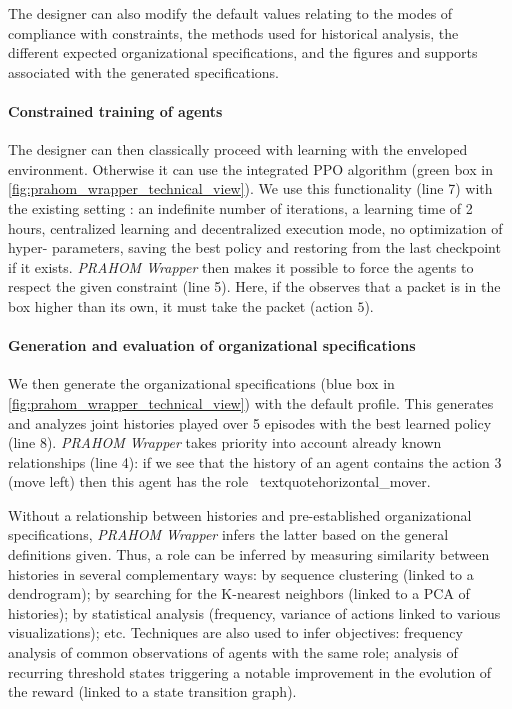 \documentclass{ecai}
\newcounter{relation}
\begin{document}
The designer can also modify the default values relating to the modes of compliance with constraints, the methods used for historical analysis, the different expected organizational specifications, and the figures and supports associated with the generated specifications.

\paragraph{Constrained training of agents}

The designer can then classically proceed with learning with the enveloped environment. Otherwise it can use the integrated PPO algorithm (green box in \autoref{fig:prahom_wrapper_technical_view}). We use this functionality (line 7) with the existing setting : an indefinite number of iterations, a learning time of 2 hours, centralized learning and decentralized execution mode, no optimization of hyper- parameters, saving the best policy and restoring from the last checkpoint if it exists.
\emph{PRAHOM Wrapper} then makes it possible to force the agents to respect the given constraint (line 5). Here, if the  observes that a packet is in the box higher than its own, it must take the packet (action $5$).

\paragraph{Generation and evaluation of organizational specifications}

We then generate the organizational specifications (blue box in \autoref{fig:prahom_wrapper_technical_view}) with the default profile. This generates and analyzes joint histories played over 5 episodes with the best learned policy (line 8).
\emph{PRAHOM Wrapper} takes priority into account already known relationships (line 4): if we see that the history of an agent contains the action $3$ (move left) then this agent has the role \ textquote{horizontal\_mover}.

Without a relationship between histories and pre-established organizational specifications, \emph{PRAHOM Wrapper} infers the latter based on the general definitions given. Thus, a role can be inferred by measuring similarity between histories in several complementary ways: by sequence clustering (linked to a dendrogram); by searching for the K-nearest neighbors (linked to a PCA of histories); by statistical analysis (frequency, variance of actions linked to various visualizations); etc.
Techniques are also used to infer objectives: frequency analysis of common observations of agents with the same role; analysis of recurring threshold states triggering a notable improvement in the evolution of the reward (linked to a state transition graph).
\end{document}
